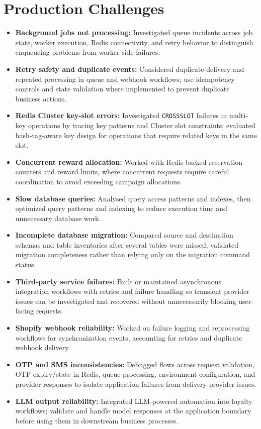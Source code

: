 \documentclass[letterpaper,10pt]{article}
\newcommand{\itemx}[1]{\item\small{#1\vspace{-2pt}}}
\begin{document}
\section{Production Challenges}
\begin{itemize}[leftmargin=.18in]
\itemx{\textbf{Background jobs not processing:} Investigated queue incidents across job state, worker execution, Redis connectivity, and retry behavior to distinguish enqueueing problems from worker-side failures.}
\itemx{\textbf{Retry safety and duplicate events:} Considered duplicate delivery and repeated processing in queue and webhook workflows; use idempotency controls and state validation where implemented to prevent duplicate business actions.}
\itemx{\textbf{Redis Cluster key-slot errors:} Investigated \texttt{CROSSSLOT} failures in multi-key operations by tracing key patterns and Cluster slot constraints; evaluated hash-tag-aware key design for operations that require related keys in the same slot.}
\itemx{\textbf{Concurrent reward allocation:} Worked with Redis-backed reservation counters and reward limits, where concurrent requests require careful coordination to avoid exceeding campaign allocations.}
\itemx{\textbf{Slow database queries:} Analysed query access patterns and indexes, then optimized query patterns and indexing to reduce execution time and unnecessary database work.}
\itemx{\textbf{Incomplete database migration:} Compared source and destination schemas and table inventories after several tables were missed; validated migration completeness rather than relying only on the migration command status.}
\itemx{\textbf{Third-party service failures:} Built or maintained asynchronous integration workflows with retries and failure handling so transient provider issues can be investigated and recovered without unnecessarily blocking user-facing requests.}
\itemx{\textbf{Shopify webhook reliability:} Worked on failure logging and reprocessing workflows for synchronization events, accounting for retries and duplicate webhook delivery.}
\itemx{\textbf{OTP and SMS inconsistencies:} Debugged flows across request validation, OTP expiry/state in Redis, queue processing, environment configuration, and provider responses to isolate application failures from delivery-provider issues.}
\itemx{\textbf{LLM output reliability:} Integrated LLM-powered automation into loyalty workflows; validate and handle model responses at the application boundary before using them in downstream business processes.}
\end{itemize}
\end{document}
